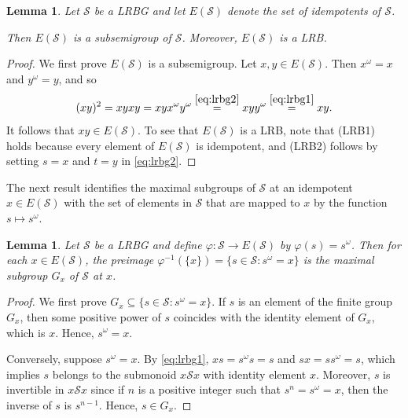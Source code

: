 \documentclass[11pt, oneside, reqno]{amsart}
\newtheorem{lemma}[theorem]{Lemma}
\theoremstyle{definition}
\numberwithin{equation}{section}
\def \SS{{\mathcal{S}}}
\begin{document}
\begin{lemma}
    Let $\SS$ be a LRBG and let $E(\SS)$ denote the set of idempotents of $\SS$.

    Then $E(\SS)$ is a subsemigroup of $\SS$. Moreover, $E(\SS)$ is a LRB.
\end{lemma}

\begin{proof}
    We first prove $E(\SS)$ is a subsemigroup.
    Let $x, y \in E(\SS)$.
    Then $x^\omega = x$ and $y^\omega = y$,
    and so
    \begin{equation*}
        (x y)^2
        = x y x y
        = x y x^\omega y^\omega
        \overset{\cref{eq:lrbg2}}{=}
        x y y^\omega
        \overset{\cref{eq:lrbg1}}{=}
        x y.
    \end{equation*}
    It follows that $x y \in E(\SS)$.
    To see that $E(\SS)$ is a LRB, note that (LRB1) holds because every element
    of $E(\SS)$ is idempotent, and (LRB2) follows by setting $s = x$ and $t
    = y$ in \cref{eq:lrbg2}.
\end{proof}

The next result identifies the maximal subgroups of $\SS$ at an idempotent $x
\in E(\SS)$ with the set of elements in $\SS$ that are mapped to $x$ by the
function $s \mapsto s^\omega$.

\begin{lemma}
    \label{appendix:preimages-of-omega-map-are-maximal-subgroups}
    Let $\SS$ be a LRBG and define $\varphi: \SS \xrightarrow{} E(\SS)$ by
    $\varphi(s) = s^\omega$.
    Then for each $x \in E(\SS)$, the preimage
    $\varphi^{-1}(\{x\}) = \{ s \in \SS : s^\omega = x \}$ is the maximal
    subgroup $G_x$ of $\SS$ at $x$.
\end{lemma}

\begin{proof}
    We first prove $G_x \subseteq \{s \in \SS : s^\omega = x\}$.
    If $s$ is an element of the finite group $G_x$,
    then some positive power of $s$ coincides with the
    identity element of $G_x$, which is $x$.
    Hence, $s^\omega = x$.

    Conversely, suppose $s^\omega = x$.
    By \cref{eq:lrbg1}, $x s = s^\omega s = s$ and
    $s x = s s^\omega = s$, which implies $s$
    belongs to the submonoid $x \SS x$ with identity element $x$.
    Moreover, $s$ is invertible in $x \SS x$ since if $n$ is a positive integer
    such that $s^n = s^\omega = x$, then the inverse of $s$ is $s^{n-1}$.
    Hence, $s \in G_x$.
\end{proof}
\end{document}
